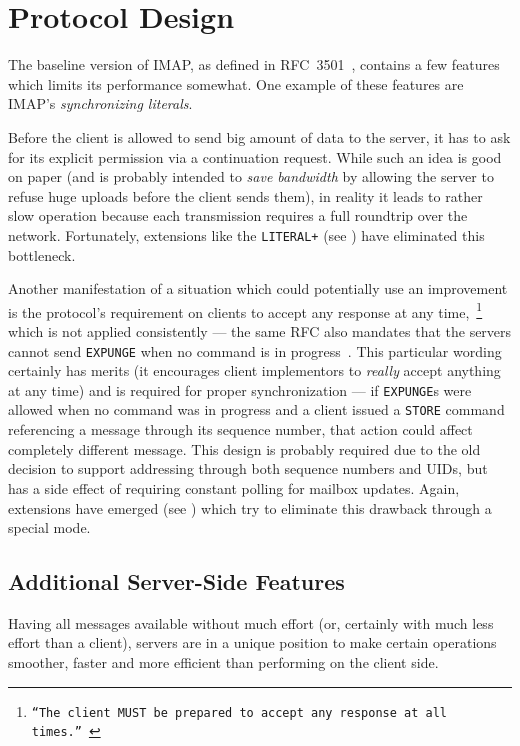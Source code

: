 \documentclass[trojita]{subfiles}
\begin{document}
\section{Protocol Design}

The baseline version of IMAP, as defined in RFC~3501~\cite{rfc3501}, contains a few features which limits its
performance somewhat.  One example of these features are IMAP's {\em synchronizing literals}.

Before the client is allowed to send big amount of data to the server, it has to ask for its explicit permission via a
continuation request.  While such an idea is good on paper (and is probably intended to {\em save bandwidth} by allowing
the server to refuse huge uploads before the client sends them), in reality it leads to rather slow operation because
each transmission requires a full roundtrip over the network.  Fortunately, extensions like the {\tt LITERAL+} (see
) have eliminated this bottleneck.

Another manifestation of a situation which could potentially use an improvement is the protocol's requirement on clients
to accept any response at any time,~\footnote{{\tt ``The client MUST be prepared to accept any response at all
times.''}~\cite[p. 61]{rfc3501}} which is not applied consistently --- the same RFC also mandates that the servers cannot
send {\tt EXPUNGE} when no command is in progress~\cite[p. 72]{rfc3501}.  This particular wording certainly has merits
(it encourages client implementors to {\em really} accept anything at any time) and is required for proper
synchronization --- if {\tt EXPUNGE}s were allowed when no command was in progress and a client issued a {\tt STORE}
command referencing a message through its sequence number, that action could affect completely different message.  This
design is probably required due to the old decision to support addressing through both sequence numbers and UIDs, but
has a side effect of requiring constant polling for mailbox updates.  Again, extensions have emerged (see
) which try to eliminate this drawback through a special mode.

\subsection{Additional Server-Side Features}

Having all messages available without much effort (or, certainly with much less effort than a client), servers are in a
unique position to make certain operations smoother, faster and more efficient than performing on the client side.
\end{document}
